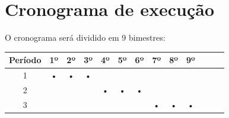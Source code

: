 \section{Cronograma de execução}

O cronograma será dividido em 9 bimestres:

\begin{table}[H]
    \centering
    \begin{tabular}{|c|c|c|c|c|c|c|c|c|c|c|c|c|}
    \hline
        Período & 1º & 2º & 3º & 4º & 5º & 6º & 7º & 8º & 9º\\
    \hline
        1 & • & • & • &  & &  &  &  & \\
    \hline
        2 &  &  &  & • & • & • &  &  &  \\
    \hline
        3 &  &  &  &  &   &  & • & • & • \\
    \hline
    \end{tabular}
\end{table}